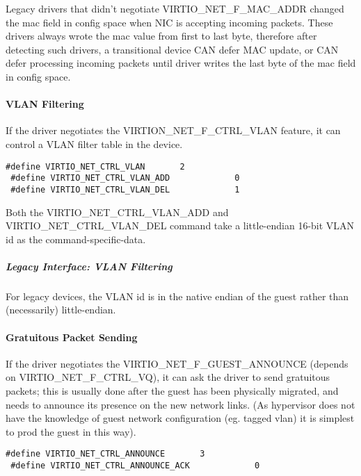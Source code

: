 Legacy drivers that didn't negotiate VIRTIO_NET_F_MAC_ADDR
changed the mac field in config space when NIC is accepting
incoming packets. These drivers always wrote the mac value from
first to last byte, therefore after detecting such drivers,
a transitional device CAN defer MAC update, or CAN defer
processing incoming packets until driver writes the last byte
of the mac field in config space.

\paragraph{VLAN Filtering}\label{sec:Device Types / Network Device / Device Operation / Control Virtqueue / VLAN Filtering}

If the driver negotiates the VIRTION_NET_F_CTRL_VLAN feature, it
can control a VLAN filter table in the device.

\begin{lstlisting}
#define VIRTIO_NET_CTRL_VLAN       2
 #define VIRTIO_NET_CTRL_VLAN_ADD             0
 #define VIRTIO_NET_CTRL_VLAN_DEL             1
\end{lstlisting}

Both the VIRTIO_NET_CTRL_VLAN_ADD and VIRTIO_NET_CTRL_VLAN_DEL
command take a little-endian 16-bit VLAN id as the command-specific-data.

\subparagraph{Legacy Interface: VLAN Filtering}\label{sec:Device Types / Network Device / Device Operation / Control Virtqueue / VLAN Filtering / Legacy Interface: VLAN Filtering}
For legacy devices, the VLAN id is in the
native endian of the guest rather than (necessarily) little-endian.

\paragraph{Gratuitous Packet Sending}\label{sec:Device Types / Network Device / Device Operation / Control Virtqueue / Gratuitous Packet Sending}

If the driver negotiates the VIRTIO_NET_F_GUEST_ANNOUNCE (depends
on VIRTIO_NET_F_CTRL_VQ), it can ask the driver to send gratuitous
packets; this is usually done after the guest has been physically
migrated, and needs to announce its presence on the new network
links. (As hypervisor does not have the knowledge of guest
network configuration (eg. tagged vlan) it is simplest to prod
the guest in this way).

\begin{lstlisting}
#define VIRTIO_NET_CTRL_ANNOUNCE       3
 #define VIRTIO_NET_CTRL_ANNOUNCE_ACK             0
\end{lstlisting}

